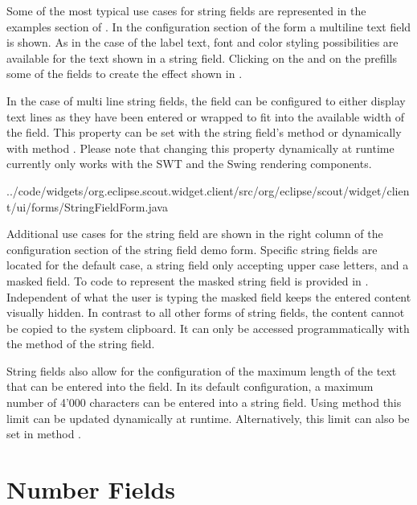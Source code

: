 \documentclass[a4paper,10pt,twoside]{book}
\begin{document}
{Some of the most typical use cases for string fields are represented in the examples section of .
In the configuration section of the form a multiline text field is shown.
As in the case of the label text, font and color styling possibilities are available for the text shown in a string field. 
Clicking on the  and on the  prefills some of the fields to create the effect shown in .

In the case of multi line string fields, the field can be configured to either display text lines as they have been entered or wrapped to fit into the available width of the field. 
This property can be set with the string field's method  or dynamically with method . 
Please note that changing this property dynamically at runtime currently only works with the SWT and the Swing rendering components.


{../code/widgets/org.eclipse.scout.widget.client/src/org/eclipse/scout/widget/client/ui/forms/StringFieldForm.java}

Additional use cases for the string field are shown in the right column of the configuration section of the string field demo form. 
Specific string fields are located for the default case, a string field only accepting upper case letters, and a masked field. 
To code to represent the masked string field is provided in .
Independent of what the user is typing the masked field keeps the entered content visually hidden. 
In contrast to all other forms of string fields, the content cannot be copied to the system clipboard.
It can only be accessed programmatically with the  method of the string field.

String fields also allow for the configuration of the maximum length of the text that can be entered into the field. 
In its default configuration, a maximum number of 4'000 characters can be entered into a string field. 
Using method  this limit can be updated dynamically at runtime. 
Alternatively, this limit can also be set in method . 

\section{Number Fields}

}
\end{document}
